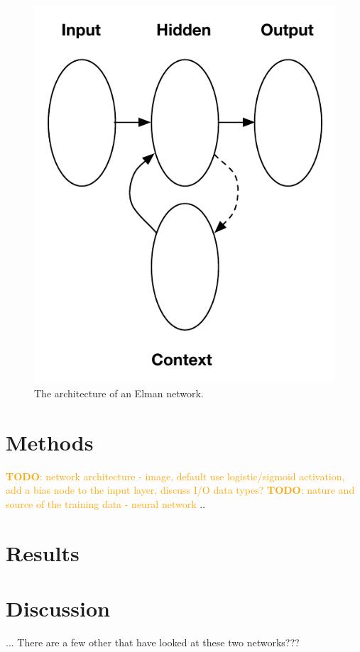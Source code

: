 \documentclass{acm_proc_article-sp}
\newcommand{\todo}[1]{\textcolor{orange}{\textbf{TODO}: #1}} %
\begin{document}
\begin{figure}
\begin{center}
\includegraphics[scale=.8]{Images/elman.pdf}
\caption{The architecture of an Elman network.}
\label{fig:elman}
\end{center}
\end{figure}

\section{Methods}
\todo{network architecture - image, default use logistic/sigmoid activation, add a bias node to the input layer, discuss I/O data types?}
\todo{nature and source of the training data - neural network }
.. 


\section{Results}

\section{Discussion}

... There are a few other that have looked at these two networks???




\end{document}
